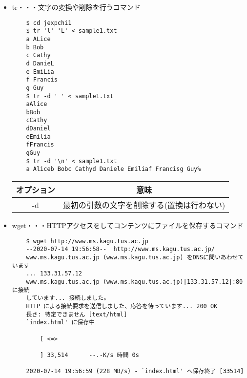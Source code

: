 \documentclass[a4paper,12pt]{jarticle}
\begin{document}
\begin{itemize}
    \item tr・・・文字の変換や削除を行うコマンド
          \begin{lstlisting}
    $ cd jexpchi1
    $ tr 'l' 'L' < sample1.txt
    a ALice
    b Bob
    c Cathy
    d DanieL
    e EmiLia
    f Francis
    g Guy
    $ tr -d ' ' < sample1.txt
    aAlice
    bBob
    cCathy
    dDaniel
    eEmilia
    fFrancis
    gGuy
    $ tr -d '\n' < sample1.txt
    a Aliceb Bobc Cathyd Daniele Emiliaf Francisg Guy%
                           \end{lstlisting}
          \begin{table}[h]
              \begin{center}
                  \begin{tabular}{|c|c|}
                      \hline
                      オプション & 意味                                       \\ \hline
                      -d         & 最初の引数の文字を削除する(置換は行わない) \\      \hline
                  \end{tabular}
              \end{center}
          \end{table}
    \item wget・・・HTTPアクセスをしてコンテンツにファイルを保存するコマンド
          \begin{lstlisting}
    $ wget http://www.ms.kagu.tus.ac.jp
    --2020-07-14 19:56:58--  http://www.ms.kagu.tus.ac.jp/
    www.ms.kagu.tus.ac.jp (www.ms.kagu.tus.ac.jp) をDNSに問いあわせています
    ... 133.31.57.12
    www.ms.kagu.tus.ac.jp (www.ms.kagu.tus.ac.jp)|133.31.57.12|:80 に接続
    しています... 接続しました。
    HTTP による接続要求を送信しました、応答を待っています... 200 OK
    長さ: 特定できません [text/html]
    `index.html' に保存中
    
        [ <=>                                       
                                                       
        ] 33,514      --.-K/s 時間 0s
    
    2020-07-14 19:56:59 (228 MB/s) - `index.html' へ保存終了 [33514]
    

\end{lstlisting}
\end{itemize}
\end{document}
